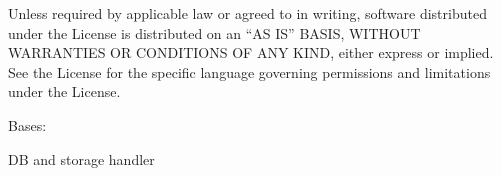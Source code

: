 \documentclass[letterpaper,10pt,english]{sphinxmanual}
\begin{document}
Unless required by applicable law or agreed to in writing, software
distributed under the License is distributed on an “AS IS” BASIS,
WITHOUT WARRANTIES OR CONDITIONS OF ANY KIND, either express or implied.
See the License for the specific language governing permissions and
limitations under the License.

\begin{fulllineitems}
\label{\detokenize{bbc1.core.data_handler:bbc1.core.data_handler.DataHandler}}
Bases: 

DB and storage handler

\begin{fulllineitems}
\label{\detokenize{bbc1.core.data_handler:bbc1.core.data_handler.DataHandler.NOTIFY_INSERTED}}
\end{fulllineitems}


\begin{fulllineitems}
\label{\detokenize{bbc1.core.data_handler:bbc1.core.data_handler.DataHandler.REPAIR_TRANSACTION_DATA}}
\end{fulllineitems}


\begin{fulllineitems}
\label{\detokenize{bbc1.core.data_handler:bbc1.core.data_handler.DataHandler.REPLICATION_ALL}}
\end{fulllineitems}



\end{fulllineitems}
\end{document}
